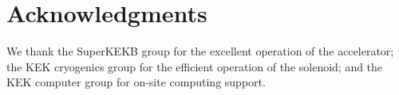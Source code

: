 \section*{Acknowledgments}

We thank the SuperKEKB group for the excellent operation of the accelerator; the KEK
cryogenics group for the efficient operation of the solenoid; and the KEK computer group for on-site computing support.